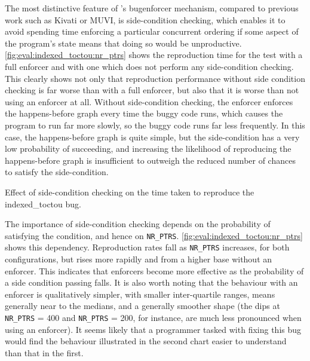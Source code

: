 The most distinctive feature of {\technique}'s \gls{bugenforcer}
mechanism, compared to previous work such as Kivati\cite{Chew2010} or
MUVI\cite{Lu2007}, is side-condition checking, which enables it to
avoid spending time enforcing a particular concurrent ordering if some
aspect of the program's state means that doing so would be
unproductive.  \autoref{fig:eval:indexed_toctou:nr_ptrs} shows the
reproduction time for the  test with a full enforcer
and with one which does not perform any side-condition checking.  This
clearly shows not only that reproduction performance without side
condition checking is far worse than with a full enforcer, but also
that it is worse than not using an enforcer at all.  Without
side-condition checking, the enforcer enforces the happens-before
graph every time the buggy code runs, which causes the program to run
far more slowly, so the buggy code runs far less frequently.  In this
case, the happens-before graph is quite simple, but the side-condition
has a very low probability of succeeding, and increasing the
likelihood of reproducing the happens-before graph is insufficient to
outweigh the reduced number of chances to satisfy the
side-condition.

\begin{sanefig}
  \caption{Effect of side-condition checking on the time taken to
    reproduce the indexed\_toctou bug.}
  \label{fig:eval:indexed_toctou:no_scs}
\end{sanefig}

The importance of side-condition checking depends on the probability
of satisfying the condition, and hence on \texttt{NR\_PTRS}.
\autoref{fig:eval:indexed_toctou:nr_ptrs} shows this dependency.
Reproduction rates fall as \texttt{NR\_PTRS} increases, for both
configurations, but rises more rapidly and from a higher base without
an enforcer.  This indicates that {\technique} enforcers become more
effective as the probability of a side condition passing falls.  It is
also worth noting that the behaviour with an enforcer is qualitatively
simpler, with smaller inter-quartile ranges, means generally near to
the medians, and a generally smoother shape (the dips at
\texttt{NR\_PTRS} = 400 and \texttt{NR\_PTRS} = 200, for instance, are
much less pronounced when using an enforcer).  It seems likely that a
programmer tasked with fixing this bug would find the behaviour
illustrated in the second chart easier to understand than that in the
first.

